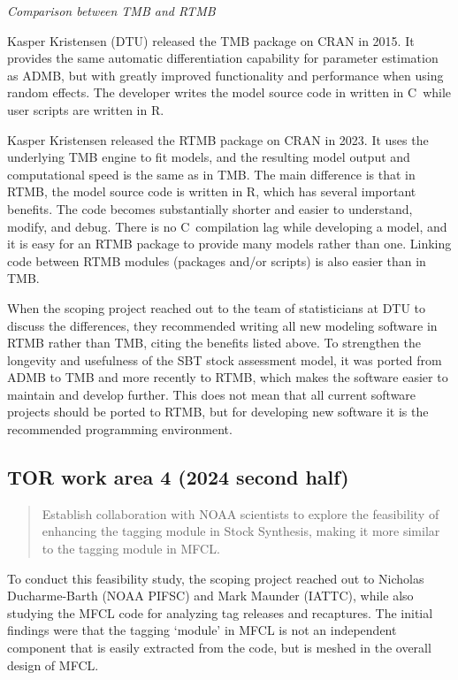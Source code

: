 \documentclass{SCreport}
\newcommand\cpp{\mbox{C\raisebox{0.5ex}{\tiny\bfseries ++}}}
\begin{document}
\vspace{2ex}

\textit{Comparison between TMB and RTMB}

Kasper Kristensen (DTU) released the TMB package on CRAN in 2015. It provides
the same automatic differentiation capability for parameter estimation as ADMB,
but with greatly improved functionality and performance when using random
effects. The developer writes the model source code in written in \cpp\, while
user scripts are written in R.

Kasper Kristensen released the RTMB package on CRAN in 2023. It uses the
underlying TMB engine to fit models, and the resulting model output and
computational speed is the same as in TMB. The main difference is that in RTMB,
the model source code is written in R, which has several important benefits. The
code becomes substantially shorter and easier to understand, modify, and debug.
There is no \cpp\ compilation lag while developing a model, and it is easy for
an RTMB package to provide many models rather than one. Linking code between
RTMB modules (packages and/or scripts) is also easier than in TMB.

When the scoping project reached out to the team of statisticians at DTU to
discuss the differences, they recommended writing all new modeling software in
RTMB rather than TMB, citing the benefits listed above. To strengthen the
longevity and usefulness of the SBT stock assessment model, it was ported from
ADMB to TMB and more recently to RTMB, which makes the software easier to
maintain and develop further. This does not mean that all current software
projects should be ported to RTMB, but for developing new software it is the
recommended programming environment.

\vspace{2ex}

\subsection{TOR work area 4 (2024 second half)}

\begin{quote}\sf
  Establish collaboration with NOAA scientists to explore the feasibility of
  enhancing the tagging module in Stock Synthesis, making it more similar to the
  tagging module in MFCL.
\end{quote}

\vspace{2ex}

To conduct this feasibility study, the scoping project reached out to Nicholas
Ducharme-Barth (NOAA PIFSC) and Mark Maunder (IATTC), while also studying the
MFCL code for analyzing tag releases and recaptures. The initial findings were
that the tagging `module' in MFCL is not an independent component that is easily
extracted from the code, but is meshed in the overall design of MFCL.
\end{document}
